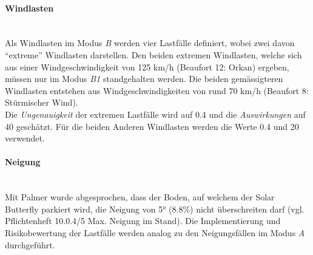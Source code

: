 \paragraph{Windlasten}\mbox{}\\
Als Windlasten im Modus \emph{B} werden vier Lastfälle definiert, wobei zwei davon ``extreme'' Windlasten darstellen. Den beiden extremen Windlasten, welche sich aus einer Windgeschwindigkeit von 125 km/h (Beaufort 12: Orkan) ergeben, müssen nur im Modus \emph{B1} standgehalten werden. Die beiden gemässigteren Windlasten entstehen aus Windgeschwindigkeiten von rund 70 km/h (Beaufort 8: Stürmischer Wind).\\
Die \emph{Ungenauigkeit} der extremen Lastfälle wird auf 0.4 und die \emph{Auswirkungen} auf 40 geschätzt. Für die beiden Anderen Windlasten werden die Werte 0.4 und 20 verwendet.
%

\paragraph{Neigung}\mbox{}\\
Mit Palmer wurde abgesprochen, dass der Boden, auf welchem der Solar Butterfly parkiert wird, die Neigung von 5° (8.8\%) nicht überschreiten darf (vgl. Pflichtenheft 10.0.4/5 Max. Neigung im Stand). Die Implementierung und Risikobewertung der Lastfälle werden analog zu den Neigungsfällen im Modus \emph{A} durchgeführt.

